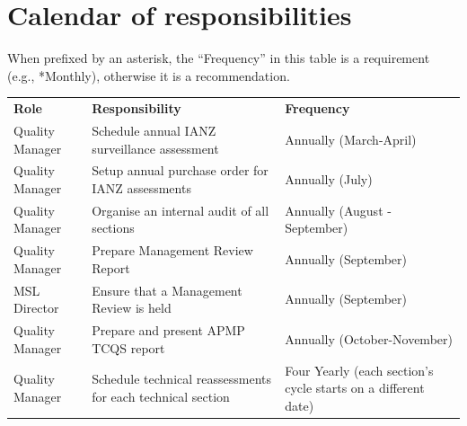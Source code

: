 \section{Calendar of responsibilities}
When prefixed by an asterisk, the ``Frequency” in this table is a requirement (e.g., *Monthly), otherwise it is a recommendation.

\begin{center}
{\renewcommand*{\arraystretch}{1.4}
\begin{tabular}{p{9em}p{20em}p{11em}}
	\rowcolor[rgb]{ 0,  0,  0} 
	\textcolor[rgb]{ 1,  1,  1}{\textbf{Role}} & 
	\textcolor[rgb]{ 1,  1,  1}{\textbf{Responsibility}} &
	\textcolor[rgb]{ 1,  1,  1}{\textbf{Frequency}} \\

Quality Manager & Schedule annual IANZ surveillance assessment & Annually (March-April)\\
Quality Manager & Setup annual purchase order for IANZ assessments & Annually (July)\\
Quality Manager & Organise an internal audit of all sections & Annually (August - September)\\ 
Quality Manager & Prepare Management Review Report & Annually (September)\\
MSL Director & Ensure that a Management Review is held & Annually (September)\\ 
Quality Manager & Prepare and present APMP TCQS report & Annually (October-November)\\
Quality Manager & Schedule technical reassessments for each technical section & Four Yearly (each section's cycle starts on a different date)\\

\hline 
\end{tabular} 
}
\end{center}